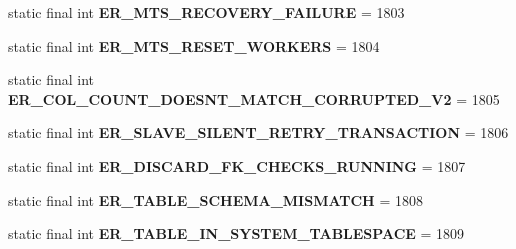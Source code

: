 \begin{DoxyCompactItemize}
static final int {\bfseries E\+R\+\_\+\+M\+T\+S\+\_\+\+R\+E\+C\+O\+V\+E\+R\+Y\+\_\+\+F\+A\+I\+L\+U\+RE} = 1803
\item 
\mbox{\label{classcom_1_1mysql_1_1cj_1_1exceptions_1_1_mysql_error_numbers_a0780d929d3e630b18768c4609552c840}} 
static final int {\bfseries E\+R\+\_\+\+M\+T\+S\+\_\+\+R\+E\+S\+E\+T\+\_\+\+W\+O\+R\+K\+E\+RS} = 1804
\item 
\mbox{\label{classcom_1_1mysql_1_1cj_1_1exceptions_1_1_mysql_error_numbers_a036ec7cffa4d34df7b638aea0679662f}} 
static final int {\bfseries E\+R\+\_\+\+C\+O\+L\+\_\+\+C\+O\+U\+N\+T\+\_\+\+D\+O\+E\+S\+N\+T\+\_\+\+M\+A\+T\+C\+H\+\_\+\+C\+O\+R\+R\+U\+P\+T\+E\+D\+\_\+\+V2} = 1805
\item 
\mbox{\label{classcom_1_1mysql_1_1cj_1_1exceptions_1_1_mysql_error_numbers_a27f55c5f11ef9f3ce2aa24691db9640b}} 
static final int {\bfseries E\+R\+\_\+\+S\+L\+A\+V\+E\+\_\+\+S\+I\+L\+E\+N\+T\+\_\+\+R\+E\+T\+R\+Y\+\_\+\+T\+R\+A\+N\+S\+A\+C\+T\+I\+ON} = 1806
\item 
\mbox{\label{classcom_1_1mysql_1_1cj_1_1exceptions_1_1_mysql_error_numbers_ad947dc4d79f325f3d96c313fc7c95ab3}} 
static final int {\bfseries E\+R\+\_\+\+D\+I\+S\+C\+A\+R\+D\+\_\+\+F\+K\+\_\+\+C\+H\+E\+C\+K\+S\+\_\+\+R\+U\+N\+N\+I\+NG} = 1807
\item 
\mbox{\label{classcom_1_1mysql_1_1cj_1_1exceptions_1_1_mysql_error_numbers_af7696f018b66c14ab8e424900da911f2}} 
static final int {\bfseries E\+R\+\_\+\+T\+A\+B\+L\+E\+\_\+\+S\+C\+H\+E\+M\+A\+\_\+\+M\+I\+S\+M\+A\+T\+CH} = 1808
\item 
\mbox{\label{classcom_1_1mysql_1_1cj_1_1exceptions_1_1_mysql_error_numbers_a9e88a5b94f97c97892badd9e5cec2ff4}} 
static final int {\bfseries E\+R\+\_\+\+T\+A\+B\+L\+E\+\_\+\+I\+N\+\_\+\+S\+Y\+S\+T\+E\+M\+\_\+\+T\+A\+B\+L\+E\+S\+P\+A\+CE} = 1809
\item 
\mbox{\label{classcom_1_1mysql_1_1cj_1_1exceptions_1_1_mysql_error_numbers_a4f941c95c7acaa4cd2a19400a4295cab}} 

\end{DoxyCompactItemize}
